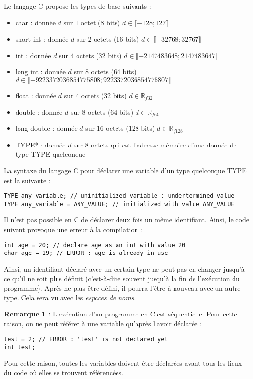 \documentclass[../../../main.tex]{subfiles}
\begin{document}
Le langage C propose les types de base suivants :
\begin{itemize}
	\item \textsf{char} : donnée $d$ sur 1 octet (8 bits) $d\in{\llbracket-128; 127\rrbracket}$
	\item \textsf{short int} : donnée $d$ sur 2 octets (16 bits) $d\in{\llbracket-32768; 32767\rrbracket}$
	\item \textsf{int} : donnée $d$ sur 4 octets (32 bits) $d\in{\llbracket-2147483648; 2147483647\rrbracket}$
	\item \textsf{long int} : donnée $d$ sur 8 octets (64 bits) $d\in{\llbracket-9223372036854775808; 9223372036854775807\rrbracket}$
	\item \textsf{float} : donnée $d$ sur 4 octets (32 bits) $d\in{\mathbb{R}_{f32}}$
	\item \textsf{double} : donnée $d$ sur 8 octets (64 bits) $d\in{\mathbb{R}_{f64}}$
	\item \textsf{long double} : donnée $d$ sur 16 octets (128 bits) $d\in{\mathbb{R}_{f128}}$
	\item \textsf{TYPE*} : donnée $d$ sur 8 octets qui est l'adresse mémoire d'une donnée de type \textsf{TYPE} quelconque
\end{itemize}
La syntaxe du langage C pour déclarer une variable d'un type quelconque \textsf{TYPE} est la suivante :
\begin{verbatim}
TYPE any_variable; // uninitialized variable : undertermined value
TYPE any_variable = ANY_VALUE; // initialized with value ANY_VALUE
\end{verbatim}
Il n'est pas possible en C de déclarer deux fois un même identifiant. Ainsi, le code suivant provoque une erreur à la compilation :
\begin{verbatim}
int age = 20; // declare age as an int with value 20
char age = 19; // ERROR : age is already in use
\end{verbatim}
Ainsi, un identifiant déclaré avec un certain type ne peut pas en changer jusqu'à ce qu'il ne soit plus définit (c'est-à-dire souvent jusqu'à la fin de l'exécution du programme). Après ne plus être défini, il pourra l'être à nouveau avec un autre type. Cela sera vu avec les \textit{espaces de noms}.
 
\textbf{Remarque 1 :} L'exécution d'un programme en C est séquentielle. Pour cette raison, on ne peut référer à une variable qu'après l'avoir déclarée :
\begin{verbatim}
test = 2; // ERROR : 'test' is not declared yet
int test;
\end{verbatim}
Pour cette raison, toutes les variables doivent être déclarées avant tous les lieux du code où elles se trouvent référencées.
 
\end{document}
